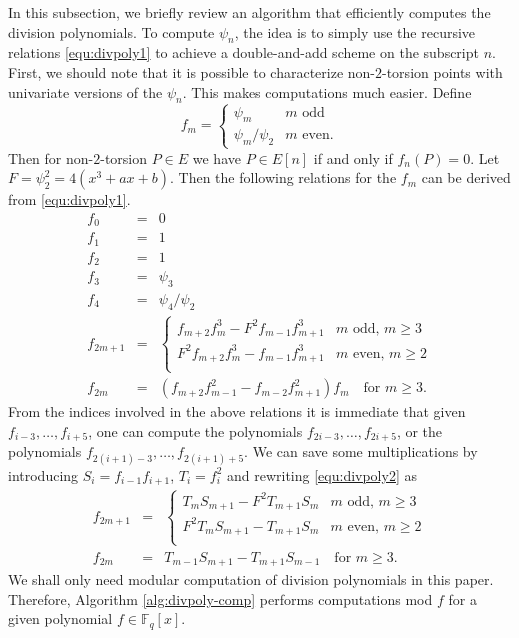 \documentclass[11pt]{article}
\theoremstyle{plain}
\theoremstyle{definition}
\def\F{\ensuremath{\mathbb{F}}}
\begin{document}
In this subsection, we briefly review an algorithm that efficiently computes the division 
polynomials. To compute $\psi_n$, the idea is to simply use the recursive relations 
\eqref{equ:divpoly1} to achieve a double-and-add scheme on the subscript $n$. First, we should note 
that it is possible to characterize non-$2$-torsion points with univariate versions of the 
$\psi_n$. This makes computations much easier. Define
\[
f_m = 
\begin{cases}
	\psi_m & m \text{ odd} \\
	\psi_m / \psi_2 & m \text{ even}.
\end{cases}
\]
Then for non-$2$-torsion $P \in E$ we have $P \in E[n]$ if and only if $f_n(P) = 0$. Let $F = 
\psi_2^2 = 4(x^3 + ax + b)$. Then the following relations for the $f_m$ can be derived from 
\eqref{equ:divpoly1}.
\begin{equation}
\label{equ:divpoly2}
	\begin{array}{rll}
		f_0 & = & 0 \\
		f_1 & = & 1 \\
		f_2 & = & 1 \\
		f_3 & = & \psi_3 \\
		f_4 & = & \psi_4 / \psi_2 \\
		f_{2m + 1} & = & 
		\begin{cases}
			f_{m + 2}f_m^3 - F^2f_{m - 1}f_{m + 1}^3 & m \text{ odd, } m \ge 3 \\
			F^2f_{m + 2}f_m^3 - f_{m - 1}f_{m + 1}^3 & m \text{ even, } m \ge 2 \\
		\end{cases} \\
		f_{2m} & = & (f_{m + 2}f_{m - 1}^2 - f_{m - 2}f_{m + 1}^2)f_m \quad \text{for } m \ge 3.
	\end{array}
\end{equation}
From the indices involved in the above relations it is immediate that given $f_{i - 3}, \dots, f_{i 
+ 5}$, one can compute the polynomials $f_{2i - 3}, \dots, f_{2i + 5}$, or the polynomials $f_{2(i 
+ 1) - 3}, \dots, f_{2(i + 1) + 5}$. We can save some multiplications by introducing $S_i = f_{i - 
1}f_{i + 1}$, $T_i = f_i^2$ and rewriting \eqref{equ:divpoly2} as
\begin{equation}
\label{equ:divpoly3}
\begin{array}{rll}
	f_{2m + 1} & = & 
	\begin{cases}
		T_mS_{m + 1} - F^2T_{m + 1}S_m & m \text{ odd, } m \ge 3 \\
		F^2T_mS_{m + 1} - T_{m + 1}S_m & m \text{ even, } m \ge 2 \\
	\end{cases} \\
	f_{2m} & = & T_{m - 1}S_{m + 1} - T_{m + 1}S_{m - 1} \quad \text{for } m \ge 3.
\end{array}
\end{equation}
We shall only need modular computation of division polynomials in this paper. Therefore, Algorithm 
\ref{alg:divpoly-comp} performs computations mod $f$ for a given polynomial $f \in \F_q[x]$.
\end{document}
